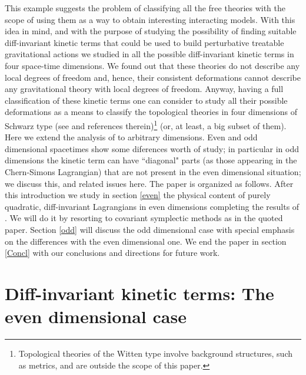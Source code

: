 \documentclass[prd,a4paper,twocolumn,amssymb,amsmath,nofootinbib,showpacs]{revtex4}
\begin{document}
This example suggests the problem of classifying all the free
theories with the scope of using them as a way to obtain
interesting interacting models. With this idea in mind, and with
the purpose of studying the possibility of finding suitable
diff-invariant kinetic terms that could be used to build
perturbative treatable gravitational actions we studied in
\cite{Barbero:1999ts} all the possible diff-invariant kinetic
terms in four space-time dimensions. We found out that these
theories do not describe any local degrees of freedom and, hence,
their consistent deformations cannot describe any gravitational
theory with local degrees of freedom. Anyway, having a full
classification of these kinetic terms one can consider to study
all their possible deformations as a means to classify the
topological theories in four dimensions of Schwarz type (see
\cite{Schwarz:2000cb} and references therein)\footnote{Topological
theories of the Witten type involve background structures, such as
metrics, and are outside the scope of this paper.} (or, at least,
a big subset of them). Here we extend the analysis of
\cite{Barbero:1999ts} to arbitrary dimensions. Even and odd
dimensional spacetimes show some diferences worth of study; in
particular in odd dimensions the kinetic term can have ``diagonal"
parts (as those appearing in the Chern-Simons Lagrangian) that are
not present in the even dimensional situation; we discuss this,
and related issues here. The paper is organized as follows. After
this introduction we study in section \ref{even} the physical
content of purely quadratic, diff-invariant Lagrangians in even
dimensions completing the results of \cite{Barbero:1999ts}. We
will do it by resorting to covariant symplectic methods as in the
quoted paper. Section \ref{odd} will discuss the odd dimensional
case with special emphasis on the differences with the even
dimensional one. We end the paper in section \ref{Concl} with our
conclusions and directions for future work.


\section{\label{even} Diff-invariant kinetic terms: The even
dimensional case}
\end{document}
